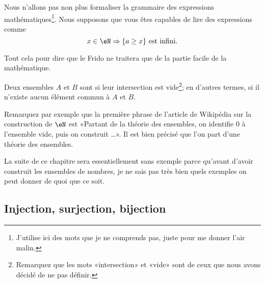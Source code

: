\begin{normaltext}
	Nous n'allons pas non plus formaliser la grammaire des expressions mathématiques\footnote{J'utilise ici des mots que je ne comprends pas, juste pour me donner l'air malin.}. Nous supposons que vous êtes capables de lire des expressions comme
	\begin{equation}
		x\in \eN\Rightarrow\{ a\geq x \}\text{ est infini}.
	\end{equation}
\end{normaltext}

Tout cela pour dire que le Frido ne traitera que de la partie facile de la mathématique.

\begin{definition}\label{DefEnsemblesDisjoints}
	Deux ensembles \( A\) et \( B\) sont  si leur intersection est vide\footnote{Remarquez que les mots «intersection» et «vide» sont de ceux que nous avons décidé de ne pas définir.}; en d'autres termes, si il n'existe aucun élément commun à \( A\) et \( B\).
\end{definition}

\begin{normaltext}
	Remarquez par exemple que la première phrase de l'article de Wikipédia sur la construction de \( \eN\) est «Partant de la théorie des ensembles, on identifie 0 à l'ensemble vide, puis on construit \ldots». Il est bien précisé que l'on part d'une théorie des ensembles.
\end{normaltext}

\begin{normaltext}
	La suite de ce chapitre sera essentiellement sans exemple parce qu'avant d'avoir construit les ensembles de nombres, je ne sais pas très bien quels exemples on peut donner de quoi que ce soit.
\end{normaltext}


\subsection{Injection, surjection, bijection}

